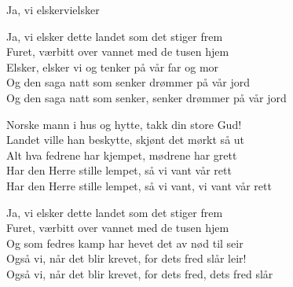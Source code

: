 \begin{song}{Ja, vi elsker}{vielsker}
\begin{vers}
Ja, vi elsker dette landet som det stiger frem\\
Furet, værbitt over vannet med de tusen hjem\\
Elsker, elsker vi og tenker på vår far og mor\\
Og den saga natt som senker drømmer på vår jord\\
Og den saga natt som senker, senker drømmer på vår jord\\
\end{vers}
\begin{vers}
Norske mann i hus og hytte, takk din store Gud!\\
Landet ville han beskytte, skjønt det mørkt så ut\\
Alt hva fedrene har kjempet, mødrene har grett\\
Har den Herre stille lempet, så vi vant vår rett\\
Har den Herre stille lempet, så vi vant, vi vant vår rett\\
\end{vers}
\begin{vers}
Ja, vi elsker dette landet som det stiger frem\\
Furet, værbitt over vannet med de tusen hjem\\
Og som fedres kamp har hevet det av nød til seir\\
Også vi, når det blir krevet, for dets fred slår leir!\\
Også vi, når det blir krevet, for dets fred, dets fred slår\\
\end{vers}
\end{song}
